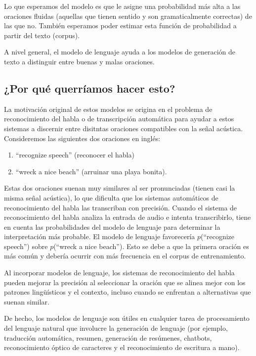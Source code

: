 Lo que esperamos del modelo es que le asigne una probabilidad más alta a las oraciones fluidas (aquellas que tienen sentido y son gramaticalmente correctas) de las que no. También esperamos poder estimar esta función de probabilidad a partir del texto (corpus).

A nivel general, el modelo de lenguaje ayuda a los modelos de generación de texto a distinguir entre buenas y malas oraciones.


\subsection{¿Por qué querríamos hacer esto?}

La motivación original de estos modelos se origina en el problema de reconocimiento del habla o de transcripción automática para ayudar a estos sistemas a discernir entre disitntas oraciones compatibles con la señal acústica.  Consideremos las siguientes dos oraciones en inglés:
\begin{enumerate}
 \item ``recognize speech''  (reconocer el habla)
 \item ``wreck a nice beach'' (arruinar una playa bonita).
\end{enumerate}

Estas dos oraciones suenan muy similares al ser pronunciadas (tienen casi la misma señal acústica), lo que dificulta que los sistemas automáticos de reconocimiento del habla las transcriban con precisión. Cuando el sistema de reconocimiento del habla analiza la entrada de audio e intenta transcribirlo, tiene en cuenta las probabilidades del modelo de lenguaje para determinar la interpretación más probable.
El modelo de lenguaje favorecería $p$(``recognize speech'') sobre $p$(``wreck a nice beach'').
Esto se debe a que la primera oración es más común y debería ocurrir con más frecuencia en el corpus de entrenamiento.

Al incorporar modelos de lenguaje, los sistemas de reconocimiento del habla pueden mejorar  la precisión al seleccionar la oración que se alinea mejor con los patrones lingüísticos y el contexto, incluso cuando se enfrentan a alternativas que suenan similar.

De hecho, los modelos de lenguaje son útiles en cualquier tarea de procesamiento del lenguaje natural que involucre la generación de lenguaje (por ejemplo, traducción automática, resumen, generación de resúmenes, chatbots,  reconocimiento óptico de caracteres y el reconocimiento de escritura a mano).

